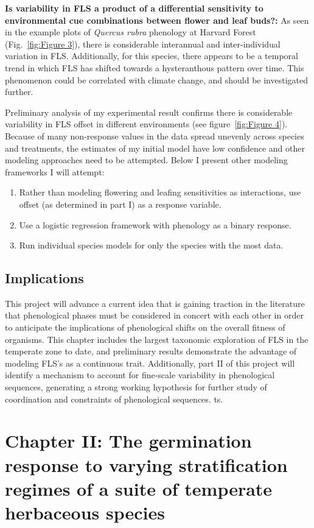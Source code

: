 \documentclass[12pt]{article}\usepackage[]{graphicx}\usepackage[]{color}
\begin{document}
\par\textbf{Is variability in FLS a product of a differential sensitivity to environmental cue combinations between flower and leaf buds?:} As seen in the  example plots of \textit{Quercus rubra} phenology at Harvard Forest (Fig.~\ref{fig:Figure 3}), there is considerable interannual and inter-individual variation in FLS. Additionally, for this species, there appears to be a temporal trend in which FLS has shifted towards a hysteranthous pattern over time. This phenomenon could be correlated with climate change, and should be investigated further.
\par Preliminary analysis of my experimental result confirms there is considerable variability in FLS offset in different environments (see figure~\ref{fig:Figure 4}). Because of many non-response values in the data spread unevenly across species and treatments, the estimates of my initial model have low confidence and other modeling approaches need to be attempted. Below I present other modeling frameworks I will attempt:
\begin{enumerate}
\item Rather than modeling flowering and leafing sensitivities as interactions, use offset (as determined in part I) as a response variable.
\item Use a logistic regression framework with phenology as a binary response.
\item Run individual species models for only the species with the most data.
\end{enumerate}
\subsection*{Implications}
\indent\indent This project will advance a current idea that is gaining traction in the literature that phenological phases must be considered in concert with each other in order to anticipate the implications of phenological shifts on the overall fitness of organisms. This chapter includes the largest taxonomic exploration of FLS in the temperate zone to date, and preliminary results demonstrate the advantage of modeling FLS's as a continuous trait. Additionally, part II of this project will identify a mechanism to account for fine-scale variability in phenological sequences, generating a strong working hypothesis for further study of coordination and constraints of phenological sequences. 
ts.
\section*{Chapter II: The germination response to varying stratification regimes of a suite of temperate herbaceous species}
\end{document}
